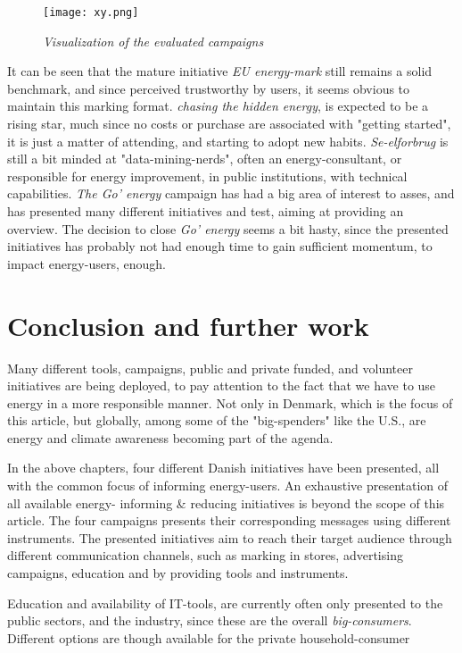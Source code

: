 \documentclass[journal]{IEEEtran}
\begin{document}
\begin{figure}
\texttt{[image: xy.png]}
\caption{\textit{Visualization of the evaluated campaigns}}			
\label{fig:xy} %
\end{figure}


It can be seen that the mature initiative \textit{EU energy-mark} still remains a solid benchmark, and since perceived trustworthy by users, it seems obvious to maintain this marking format.
\textit{chasing the hidden energy}, is expected to be a rising star, much since no costs or purchase are associated with "getting started", it is just a matter of attending, and starting to adopt new habits.
\textit{Se-elforbrug} is still a bit minded at "data-mining-nerds", often an energy-consultant, or responsible for energy improvement, in public institutions, with technical capabilities.
\textit{The Go' energy} campaign has had a big area of interest to asses, and has presented many different initiatives and test, aiming at providing an overview. The decision to close \textit{Go' energy} seems a bit hasty, since the presented initiatives has probably not had enough time to gain sufficient momentum, to impact energy-users, enough.     

\section{Conclusion and further work}
Many different tools, campaigns, public and private funded, and volunteer initiatives are being deployed, to pay attention to the fact that we have to use energy in a more responsible manner. Not only in Denmark, which is the focus of this article, but globally,  among some of the "big-spenders" like the U.S., are energy and climate awareness becoming part of the agenda. \newline

In the above chapters, four different Danish initiatives have been presented, all with the common focus of informing energy-users. An exhaustive presentation of all available energy- informing \& reducing initiatives is beyond the scope of this article. The four campaigns presents their corresponding messages using different instruments. The presented initiatives aim to reach their target audience through different communication channels, such as marking in stores, advertising campaigns, education and by providing tools and instruments.

Education and availability of IT-tools, are currently often only presented to the public sectors, and the industry, since these are the overall \textit{big-consumers}. Different options are though available for the private household-consumer 
\end{document}

